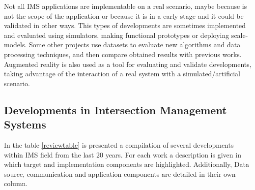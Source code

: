\documentclass[conference]{IEEEtran}
\begin{document}
Not all IMS applications are implementable on a real scenario, maybe because is not the scope of the application or because it is in a early stage and it could be validated in other ways. This types of developments are sometimes implemented and evaluated using simulators, making functional prototypes or deploying scale-models. Some other projects use datasets to evaluate new algorithms and data processing techniques, and then compare obtained results with previous works. Augmented reality is also used as a tool for evaluating and validate developments, taking advantage of the interaction of a real system with a simulated/artificial scenario.

\subsection{Developments in Intersection Management Systems}

In the table \ref{reviewtable} is presented a compilation of several developments within IMS field from the last 20 years. For each work a description is given in which target and implementation components are highlighted. Additionally, Data source, communication and application components are detailed in their own column. 


\footnotesize
\onecolumn
%
\end{document}
